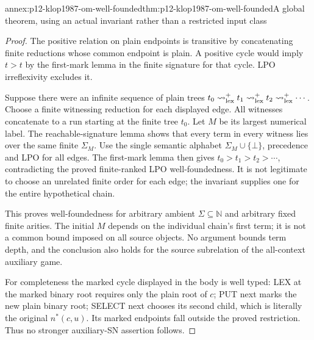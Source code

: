 \begin{annexitem}{annex:p12-klop1987-om-well-founded}{thm:p12-klop1987-om-well-founded}{A global theorem, using an actual invariant rather than a restricted input class}
\begin{proof}
The positive relation on plain endpoints is transitive by concatenating
finite reductions whose common endpoint is plain. A positive cycle
would imply \(t>t\) by the first-mark lemma in the finite signature
for that cycle. LPO irreflexivity excludes it.

Suppose there were an infinite sequence of plain trees
\(t_0\rightsquigarrow_{\rm lex}^{+}t_1
\rightsquigarrow_{\rm lex}^{+}t_2\rightsquigarrow_{\rm lex}^{+}\cdots\).
Choose a finite witnessing reduction for each displayed edge.
All witnesses concatenate to a run starting at the finite tree
\(t_0\). Let \(M\) be its largest numerical label. The
reachable-signature lemma shows that every term in every witness
lies over the same finite \(\Sigma_M\). Use the single semantic
alphabet \(\Sigma_M\cup\{\bot\}\), precedence and LPO for
all edges. The first-mark lemma then gives
\(t_0>t_1>t_2>\cdots\), contradicting the proved finite-ranked
LPO well-foundedness. It is not legitimate to choose an unrelated
finite order for each edge; the invariant supplies one for the
entire hypothetical chain.

This proves well-foundedness for arbitrary ambient
\(\Sigma\subseteq\mathbb N\) and arbitrary fixed finite
arities. The initial \(M\) depends on the individual chain's
first term; it is not a common bound imposed on all source objects.
No argument bounds term depth, and the conclusion also holds for
the source subrelation of the all-context auxiliary game.

For completeness the marked cycle displayed in the body is well
typed: LEX at the marked binary root requires only the plain root
of \(c\); PUT next marks the new plain binary root; SELECT next
chooses its second child, which is literally the original
\(n^*(c,u)\). Its marked endpoints fall outside the proved
restriction. Thus no stronger auxiliary-SN assertion follows.
\end{proof}
\end{annexitem}

